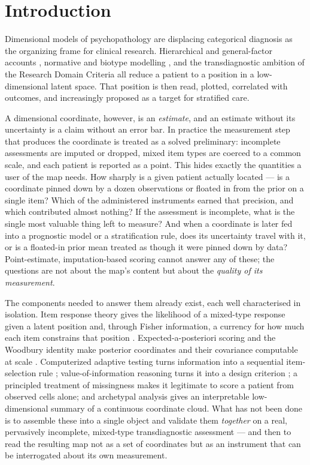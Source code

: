 \section{Introduction}

Dimensional models of psychopathology are displacing categorical diagnosis as
the organizing frame for clinical research. Hierarchical and general-factor
accounts \citep{caspi2014pfactor,lahey2017general,kotov2017hitop,ruggero2019hitop},
normative and biotype modelling \citep{marquand2016,wolfers2018,clementz2016biotypes},
and the transdiagnostic ambition of the Research Domain Criteria
\citep{insel2010rdoc} all reduce a patient to a position in a low-dimensional
latent space. That position is then read, plotted, correlated with outcomes, and
increasingly proposed as a target for stratified care.

A dimensional coordinate, however, is an \emph{estimate}, and an estimate without
its uncertainty is a claim without an error bar. In practice the measurement step
that produces the coordinate is treated as a solved preliminary: incomplete
assessments are imputed or dropped, mixed item types are coerced to a common
scale, and each patient is reported as a point. This hides exactly the quantities
a user of the map needs. How sharply is a given patient actually located --- is a
coordinate pinned down by a dozen observations or floated in from the prior on a
single item? Which of the administered instruments earned that precision, and
which contributed almost nothing? If the assessment is incomplete, what is the
single most valuable thing left to measure? And when a coordinate is later fed
into a prognostic model or a stratification rule, does its uncertainty travel with
it, or is a floated-in prior mean treated as though it were pinned down by data?
Point-estimate, imputation-based scoring cannot answer any of these; the questions
are not about the map's content but about the \emph{quality of its measurement}.

The components needed to answer them already exist, each well characterised in
isolation. Item response theory gives the likelihood of a mixed-type response
given a latent position and, through Fisher information, a currency for how much
each item constrains that position
\citep{lord1980irt,embretsonreise2000,samejima1969,reckase2009mirt}. Expected-a-posteriori
scoring and the Woodbury identity make posterior coordinates and their covariance
computable at scale \citep{bockaitkin1981,harville1997matrix}. Computerized
adaptive testing turns information into a sequential item-selection rule
\citep{vanderlinden2010cat}; value-of-information reasoning turns it into a design
criterion \citep{covertthomas2006}; a principled treatment of missingness
\citep{rubin1976missing,littlerubin2019} makes it legitimate to score a patient
from observed cells alone; and archetypal analysis \citep{cutler1994archetypal}
gives an interpretable low-dimensional summary of a continuous coordinate cloud.
What has not been done is to assemble these into a single object and validate them
\emph{together} on a real, pervasively incomplete, mixed-type transdiagnostic
assessment --- and then to read the resulting map not as a set of coordinates but
as an instrument that can be interrogated about its own measurement.

